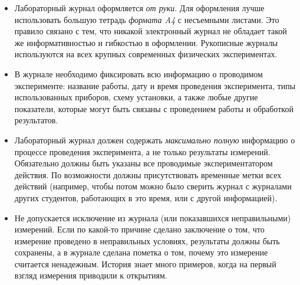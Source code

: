 \begin{itemize}
    \small
    \item Лабораторный журнал оформляется \emph{от руки}.
    Для оформления лучше использовать большую тетрадь \emph{формата A4}
    с несъемными листами. Это правило
связано с тем, что никакой электронный журнал не обладает такой же
информативностью и гибкостью в оформлении. Рукописные
журналы используются на всех крупных современных физических экспериментах.

    \item В журнале необходимо фиксировать всю информацию о проводимом
эксперименте: название работы, дату и время проведения эксперимента, типы
использованных приборов, схему установки, а также любые другие показатели,
которые могут быть связаны с проведением работы и обработкой результатов.


    \item Лабораторный журнал должен содержать \emph{максимально полную}
информацию о процессе проведения эксперимента, а не только результаты измерений.
Обязательно должны быть указаны все проводимые экспериментатором действия.
По возможности должны присутствовать временные метки всех
действий (например, чтобы потом можно было сверить журнал с журналами других
студентов, работающих в это время, или с другой информацией).


    \item Не допускается исключение из журнала  (или показавшихся
неправильными) измерений. Если по какой-то причине сделано заключение о том, что
измерение проведено в неправильных условиях, результаты должны быть сохранены, а
в журнале сделана пометка о том, почему это измерение считается ненадежным. 
История знает много примеров, когда на первый взгляд  измерения приводили к открытиям.


\end{itemize}

